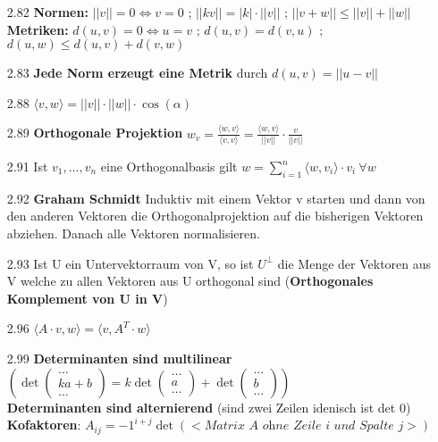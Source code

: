 \documentclass{scrartcl}
\begin{document}
\begin{itemize}
    \item [2.82] \textbf{Normen:} $||v|| = 0 \Leftrightarrow v = 0$ ; $||kv|| = |k|\cdot||v||$ ; $||v+w|| \leq ||v|| + ||w||$\\
    \textbf{Metriken:} $d(u,v) = 0 \Leftrightarrow u = v$ ; $d(u,v) = d(v,u)$ ; $d(u,w) \leq d(u,v) + d(v,w)$

    \item [2.83] \textbf{Jede Norm erzeugt eine Metrik} durch $d(u,v) = ||u - v||$

    \item [2.88] $\langle v,w \rangle = ||v|| \cdot ||w|| \cdot \cos(\alpha)$
    
    \item [2.89] \textbf{Orthogonale Projektion} $w_v = \frac{\langle w,v \rangle}{\langle v,v \rangle} = \frac{\langle w,v \rangle}{||v||} \cdot \frac{v}{||v||}$

    \item [2.91] Ist $v_1, \dots,v_n$ eine Orthogonalbasis gilt $w = \sum^{n}_{i = 1}\langle w, v_i \rangle \cdot v_i \ \forall w$

    \item [2.92] \textbf{Graham Schmidt} Induktiv mit einem Vektor v starten und dann von den anderen Vektoren die Orthogonalprojektion auf die bisherigen Vektoren abziehen. Danach alle Vektoren normalisieren.

    \item [2.93] Ist U ein Untervektorraum von V, so ist $U^{\perp}$ die Menge der Vektoren aus V welche zu allen Vektoren aus U orthogonal sind (\textbf{Orthogonales Komplement von U in V})

    \item [2.96] $\langle A \cdot v, w \rangle = \langle v, A^T \cdot w\rangle$

    \item [2.99] \textbf{Determinanten sind multilinear} $\left(\det\begin{pmatrix} \hdots \\ ka + b \\ \hdots\end{pmatrix} = k\det\begin{pmatrix} \hdots \\ a \\ \hdots\end{pmatrix} + \det\begin{pmatrix} \hdots \\ b \\ \hdots\end{pmatrix}\right)$\\ \textbf{Determinanten sind alternierend} (sind zwei Zeilen idenisch ist det 0)\\
    \textbf{Kofaktoren}: $A_{ij} = -1^{i+j} \det(<\textit{Matrix A ohne Zeile i und Spalte j}>)$


\end{itemize}
\end{document}
